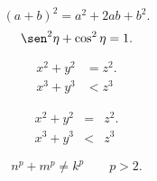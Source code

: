 
\begin{frame}[fragile]
	\frametitle{\secname}

	\begin{equation}
		\left(a+b\right)^{2}=
		a^{2}+2ab+b^{2}.
	\end{equation}
	\begin{displaymath}
		\sen^{2}\eta+\cos^{2}\eta=1.
	\end{displaymath}

	\begin{align}
		x^{2}+y^{2} & = z^{2}. \\
		x^{3}+y^{3} & <z^{3}
	\end{align}

	\begin{eqnarray}
		x^{2}+y^{2} & =& z^{2}. \\
		x^{3}+y^{3} & <&z^{3}
	\end{eqnarray}

	\begin{equation*}
		n^{p}+m^{p}\neq k^{p}\qquad p>2.
	\end{equation*}
\end{frame}






